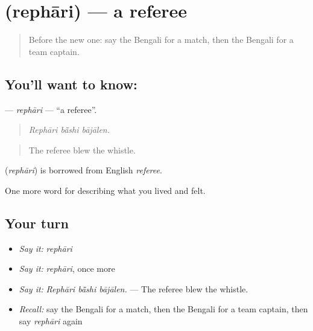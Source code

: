 \section[\texorpdfstring{\bn{রেফারি} (rephāri)}{রেফারি (rephāri)}]{ (rephāri) — a referee}

\label{lesson:BN-C519-rephari}



\begin{quote}
Before the new one: say the Bengali for a match, then the Bengali for a team captain.
\end{quote}

\subsection*{You'll want to know: }
\textbf{} — \emph{rephāri} — \textquotedblleft{}a referee\textquotedblright{}.

\begin{quote}
  
\end{quote}

\begin{quote}
\emph{Rephāri bā̃shi bājālen.}
\end{quote}

\begin{quote}
The referee blew the whistle.
\end{quote}

\begin{cousinweb}
\textbf{} (\emph{rephāri}) is borrowed from English \emph{referee}.
\end{cousinweb}

\begin{grammarlens}[title={What you've built}]
One more word for describing what you lived and felt.
\end{grammarlens}

\subsection*{Your turn}
\begin{itemize}
\raggedright
  \item \emph{Say it:} \emph{rephāri}
  \item \emph{Say it:} \emph{rephāri}, once more
  \item \emph{Say it:} \emph{Rephāri bā̃shi bājālen.} — The referee blew the whistle.
  \item \emph{Recall:} say the Bengali for a match, then the Bengali for a team captain, then say \emph{rephāri} again
\end{itemize}

